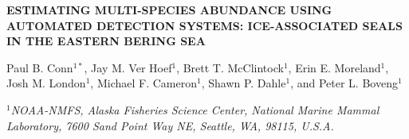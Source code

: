 \documentclass[12pt,fleqn]{article}
\begin{document}
\begin{center} \bf {\large ESTIMATING MULTI-SPECIES ABUNDANCE USING AUTOMATED DETECTION SYSTEMS: ICE-ASSOCIATED SEALS IN THE EASTERN BERING SEA}

\vspace{0.7cm}
Paul B. Conn$^{1*}$, Jay M. Ver Hoef$^1$, Brett T. McClintock$^1$, Erin E. Moreland$^1$, Josh M. London$^1$, Michael F. Cameron$^1$, Shawn P. Dahle$^1$, and Peter L. Boveng$^1$
\end{center}
\vspace{0.5cm}


\rm
\small

\it $^1$NOAA-NMFS, Alaska Fisheries Science Center, National Marine Mammal Laboratory, 7600 Sand Point Way NE, Seattle, WA, 98115, U.S.A.\\
\end{document}
